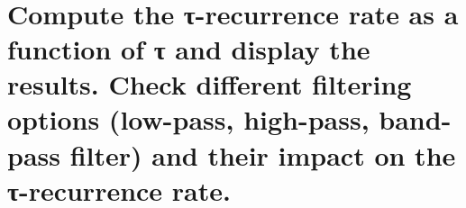 \documentclass[11pt]{article}
\begin{document}
\begin{tcolorbox}[breakable, size=fbox, boxrule=1pt, pad at break*=1mm,colback=cellbackground, colframe=cellborder]
\begin{Verbatim}[commandchars=\\\{\}]
\end{Verbatim}
\end{tcolorbox}

    \begin{center}
    \end{center}
    { \hspace*{\fill} \\}

    \hypertarget{compute-the-ux3c4-recurrence-rate-as-a-function-of-ux3c4-and-display-the-results.-check-different-filtering-options-low-pass-high-pass-band-pass-filter-and-their-impact-on-the-ux3c4-recurrence-rate.}{%
\section{Compute the τ-recurrence rate as a function of τ and display
the results. Check different filtering options (low-pass, high-pass,
band-pass filter) and their impact on the τ-recurrence
rate.}\label{compute-the-ux3c4-recurrence-rate-as-a-function-of-ux3c4-and-display-the-results.-check-different-filtering-options-low-pass-high-pass-band-pass-filter-and-their-impact-on-the-ux3c4-recurrence-rate.}}
\end{document}
